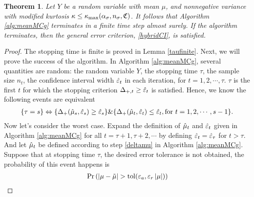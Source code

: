 \documentclass{iitthesis}
\newtheorem{theorem}{Theorem}[section]
\newtheorem{lemma}[theorem]{Lemma}
\theoremstyle{definition}
\begin{document}
\begin{theorem}\label{thm:meanMCg}
Let $Y$ be a random variable with mean $\mu$, and nonnegative variance with modified kurtosis $\kappa \leq \kappa_{\max}(\alpha_\sigma, n_\sigma, \mathfrak{C})$. It follows that Algorithm \ref{alg:meanMCg} terminates in a finite time step almost surely. If the algorithm terminates, then the general error criterion, \eqref{hybridCI}, is satisfied.
\end{theorem}
\begin{proof}
The stopping time is finite is proved in Lemma \ref{taufinite}. Next, we will prove the success of the algorithm.
In Algorithm \ref{alg:meanMCg}, several quantities are random: the random variable $Y$, the stopping time $\tau$, the sample size $n_t$,  the confidence interval width $\hat{\varepsilon}_t$ in each iteration, for $t = 1,2,\cdots, \tau$. 
$\tau$ is the first $t$ for which the stopping criterion $\Delta_{+, t} \geq \hat{\varepsilon}_t$ is satisfied. Hence, we know the following events are equivalent
\begin{align}\label{STrelationshop}
\{\tau = s\} \Leftrightarrow \{\Delta_{+}(\hat{\mu}_s,\hat{\varepsilon}_s)\geq \hat{\varepsilon}_s\} \& \{\Delta_{+}(\hat{\mu}_t,\hat{\varepsilon}_t) \leq \hat{\varepsilon}_t, \text{for }  t = 1,2,\cdots, s-1 \}.
\end{align}
Now let's consider the worst case. Expand the definition of $\hat{\mu}_t$ and $\hat{\varepsilon}_t$ given in Algorithm \ref{alg:meanMCg} for all $t = \tau+1, \tau+2, \cdots$ by defining $\hat{\varepsilon}_t = \hat{\varepsilon}_\tau$ for $t >\tau$. And let $\hat{\mu}_t$ be defined according to step \ref{deltamu} in Algorithm \ref{alg:meanMCg}. Suppose that at stopping time $\tau$, the desired error tolerance is not obtained, the probability of this event happens is
\begin{align}\label{439}
&\Pr \left( \abs{\mu-\tmu}> \tol(\varepsilon_a,\varepsilon_r\abs{\mu})\right) \nonumber\\

\end{align}
\end{proof}
\end{document}
